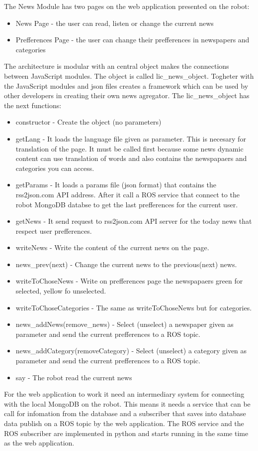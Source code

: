 The News Module has two pages on the web application presented on the robot:
\begin{itemize}
    \item News Page - the user can read, listen or change the current news
    \item Prefferences Page - the user can change their prefferences in newspapers and categories
\end{itemize}
The architecture is modular with an central object makes the connections between JavaScript modules.
The object is called lic_news_object. Togheter with the JavaScript modules and json files creates a framework
which can be used by other developers in creating their own news agregator.
The lic_news_object has the next functions:
\begin{itemize}
    \item constructor - Create the object (no parameters)
    \item getLang - It loads the language file given as parameter. This is necesary for translation of the page. It must be called
    first because some news dynamic content can use translation of words and also contains the newspapaers and categories
    you can access.
    \item getParams - It loads a params file (json format) that contains the rss2json.com API address.  After it call a ROS service
    that connect to the robot MongoDB databse to get the last prefferences for the current user.
    \item getNews - It send request to rss2json.com API server for the today news that respect user prefferences.
    \item writeNews - Write the content of the current news on the page.
    \item news_prev(next) - Change the current news to the previous(next) news.
    \item writeToChoseNews - Write on prefferences page the newspapaers green for selected, yellow fo unselected.
    \item writeToChoseCategories - The same as writeToChoseNews but for categories.
    \item news_addNews(remove_news) - Select (unselect) a newspaper given as parameter and send the current prefferences to a ROS topic.
    \item news_addCategory(removeCategory) - Select (unselect) a category given as parameter and send the current prefferences to a ROS topic.
    \item say - The robot read the current news
\end{itemize}
For the web application to work it need an intermediary system for connecting with the local MongoDB on the robot. This means it needs
a service that can be call for infomation from the database and a subscriber that saves into database data publish on a ROS topic by the
web application. The ROS service and the ROS subscriber are implemented in python and starts running in the same time as the web application.


